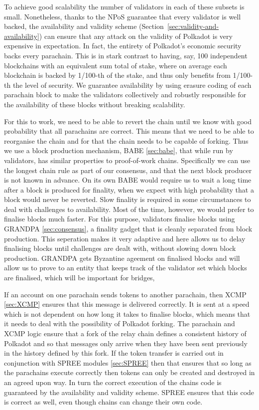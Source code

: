 To achieve good scalability the number of validators in each of these subsets is small. Nonetheless, thanks to the NPoS guarantee that every validator is well backed, the availability and validity scheme (Section~\ref{sec:validity-and-availability}) can ensure that any attack on the validity of Polkadot is very expensive in expectation. In fact, the entirety of Polkadot's economic security backs every parachain. This is in stark contrast to having, say, 100 independent blockchains with an equivalent sum total of stake, where on average each blockchain is backed by 1/100-th of the stake, and thus only benefits from 1/100-th the level of security. We guarantee availability by using erasure coding of each parachain block to make the validators collectively and robustly responsible for the availability of these blocks without breaking scalability. 

For this to work, we need to be able to revert the chain until we know with good probability that all parachains are correct. This means that we need to be able to reorganise the chain and for that the chain needs to be capable of forking. Thus we use a block production mechanism, BABE \ref{sec:babe}, that while run by validators, has similar properties to proof-of-work chains. Specifically we can use the longest chain rule as part of our consensus, and that the next block producer is not known in advance. On its own BABE would require us to wait a long time after a block is produced for finality, when we expect with high probability that a block would never be reverted. Slow finality is required in some circumstances to deal with challenges to availability. Most of the time, however, we would prefer to finalise blocks much faster.  For this purpose, validators finalise blocks using GRANDPA \ref{sec:consensus}, a finality gadget that is cleanly separated from block production. This seperation makes it very adaptive and here allows us to delay finalising blocks until challenges are dealt with, without slowing down block production. GRANDPA gets Byzantine ageement on finalised blocks and will allow us to prove to an entity that keeps track of the validator set which blocks are finalised, which will be important for bridges,

If an account on one parachain sends tokens to another parachain, then XCMP \ref{sec:XCMP} ensures that this message is delivered correctly. It is sent at a speed which is not dependent on how long it takes to finalise blocks, which means that it needs to deal with the possibility of Polkadot forking. The parachain and XCMP logic ensure that a fork of the relay chain defines a consistent history of Polkadot and so that messages only arrive when they have been sent previously in the history defined by this fork. If the token transfer is carried out in conjunction with SPREE modules \ref{sec:SPREE} then that ensures that so long as the parachains execute correctly then tokens can only be created and destroyed in an agreed upon way. In turn the correct execution of the chains code is guaranteed by the availability and validity scheme. SPREE ensures that this code is correct as well, even though chains can change their own code.








